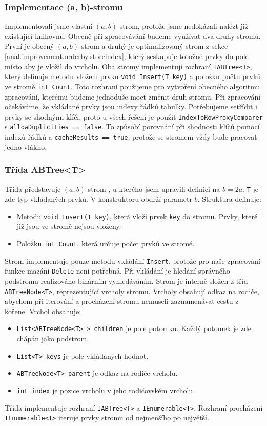 \subsubsection{Implementace (a, b)-stromu}

Implementovali jsme vlastní $(a, b)$-strom, protože jsme nedokázali nalézt již existující knihovnu.
Obecně při zpracovávání budeme využívat dva druhy stromů.
První je obecný $(a, b)$-strom a druhý je optimalizovaný strom z sekce \ref{anal.improvement.orderby.storeindex}, který seskupuje totožné prvky do pole místo aby je vložil do vrcholu.
Oba stromy implementují rozhraní \texttt{IABTree<T>}, který definuje metodu vložení prvku \texttt{void Insert(T key)} a položku počtu prvků ve stromě \texttt{int Count}.
Toto rozhraní použijeme pro vytvoření obecného algoritmu zpracování, kterému budeme jednoduše moct změnit druh stromu.
Při zpracování očekáváme, že vkládané prvky jsou indexy řádků tabulky.
Potřebujeme setřídit i prvky se shodnými klíči, proto u všech řešení je použit \texttt{IndexToRowProxyComparer} s \texttt{allowDuplicities == false}.
To způsobí porovnání při shodnosti klíčů pomocí indexů řádků a \texttt{cacheResults == true}, protože se stromem vždy bude pracovat jedno vlákno.

\subsubsection{Třída ABTree<T>}

Třída představuje $(a, b)$-strom \citep[str. 190]{labyrint}, u kterého jsem upravili definici na $b=2a$.
\texttt{T} je zde typ vkládaných prvků.
V konstruktoru obdrží parametr $b$.
Struktura definuje:
\begin{itemize}
\item Metodu \texttt{void Insert(T key)}, která vloží prvek \texttt{key} do stromu.
Prvky, které již jsou ve stromě nejsou vloženy.
\item Položku \texttt{int Count}, která určuje počet prvků ve stromě.
\end{itemize}
Strom implementuje pouze metodu vkládání \texttt{Insert}, protože pro naše zpracování funkce mazání \texttt{Delete} není potřebná.
Při vkládání je hledání správného podstromu realizováno binárním vyhledáváním.
Strom je interně složen z tříd \texttt{ABTreeNode<T>}, reprezentující vrcholy stromu.
Vrcholy obsahují odkaz na rodiče, abychom při iterování a procházení stromu nemuseli zaznamenávat cestu z kořene.
Vrchol obsahuje:
\begin{itemize}
\item \texttt{List<ABTreeNode<T> > children} je pole potomků. Každý potomek je zde chápán jako podstrom.
\item \texttt{List<T> keys} je pole vkládaných hodnot.
\item \texttt{ABTreeNode<T> parent} je odkaz na rodiče vrcholu.
\item \texttt{int index} je pozice vrcholu v jeho rodičovském vrcholu.
\end{itemize}
Třída implementuje rozhraní \texttt{IABTree<T>} a \texttt{IEnumerable<T>}.
Rozhraní procházení \texttt{IEnumerable<T>} iteruje prvky stromu od nejmenšího po největší.

